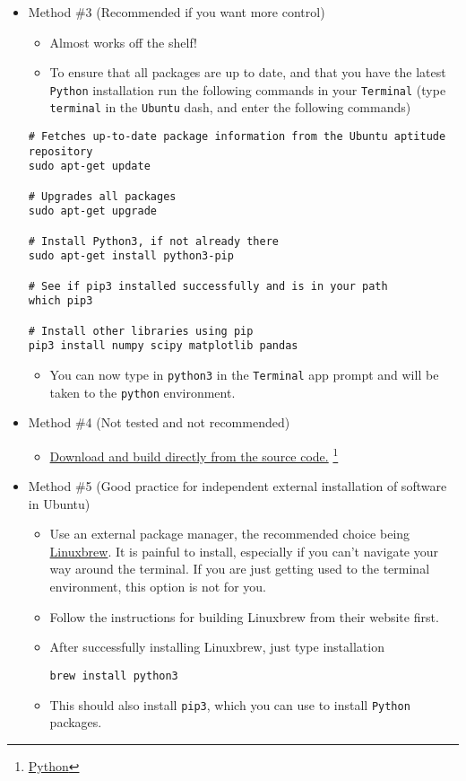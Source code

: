 \documentclass[11pt]{article}
\begin{document}
\begin{itemize}
\item Method \#3 (Recommended if you want more control)
\label{sec:org436cba9}
\begin{itemize}
\item Almost works off the shelf!
\item To ensure that all packages are up to date, and that you have the latest
\texttt{Python} installation run the following commands in your \texttt{Terminal} (type
\texttt{terminal} in the \texttt{Ubuntu} dash, and enter the following commands)
\end{itemize}

\begin{verbatim}
# Fetches up-to-date package information from the Ubuntu aptitude repository
sudo apt-get update

# Upgrades all packages
sudo apt-get upgrade

# Install Python3, if not already there
sudo apt-get install python3-pip

# See if pip3 installed successfully and is in your path
which pip3

# Install other libraries using pip
pip3 install numpy scipy matplotlib pandas

\end{verbatim}
\begin{itemize}
\item You can now type in \texttt{python3} in the \texttt{Terminal} app prompt and will be taken
to the \texttt{python} environment.
\end{itemize}

\item Method \#4 (Not tested and not recommended)
\label{sec:org523e74c}
\begin{itemize}
\item \href{https://www.python.org/downloads/source/}{Download and build directly from the source code.} \footnote{\href{https://www.python.org/}{Python}\label{org81cb480}}
\end{itemize}
\item Method \#5 (Good practice for independent external installation of software in Ubuntu)
\label{sec:org35a8b77}
\begin{itemize}
\item Use an external package manager, the recommended choice being \href{https://linuxbrew.sh/}{Linuxbrew}. It
is painful to install, especially if you can't navigate your way
around the terminal. If you are just getting used to the terminal
environment, this option is not for you.
\item Follow the instructions for building Linuxbrew from their website first.
\item After successfully installing Linuxbrew, just type installation
\begin{verbatim}
brew install python3
\end{verbatim}
\item This should also install \texttt{pip3}, which you can use to install \texttt{Python} packages.
\end{itemize}
\end{itemize}
\end{document}
